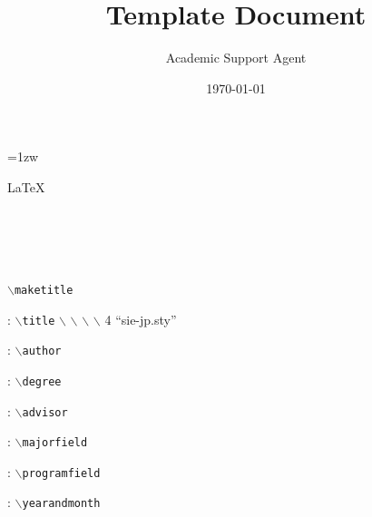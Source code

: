 \documentclass{article}
\title{Template Document}
\author{Academic Support Agent}
\date{\today}
\begin{document}
\maketitle

\maketitle
\thispagestyle{empty}
\newpage

\thispagestyle{empty}
\vspace*{20pt plus 1fil}
\parindent=1zw
\noindent
\begin{center}
{\bf  }
\vspace{5mm}
\end{center}
 
 
\LaTeX  

 
 
 \\
\\
\par
\vspace{0pt plus 1fil}
\newpage



%

\pagebreak \setcounter{page}{1}


\chapter{ }

 

 

\chapter{ }

 

\section{ }

 {\tt $\backslash$maketitle}  
 

\begin{description} \parskip=1pt
\item{ : }
 {\tt $\backslash$title}  $\backslash$	   $\backslash$  $\backslash$ $\backslash$ 
 4 	    ``sie-jp.sty'' 
\item{ : }
 {\tt $\backslash$author}  
\item{ : }
 {\tt $\backslash$degree}  
\item{ : }
 {\tt $\backslash$advisor}  
\item{ : }
 {\tt $\backslash$majorfield}  
\item{ : }
 {\tt $\backslash$programfield}  
\item{ : }
 {\tt $\backslash$yearandmonth}  
\end{description}
\end{document}
